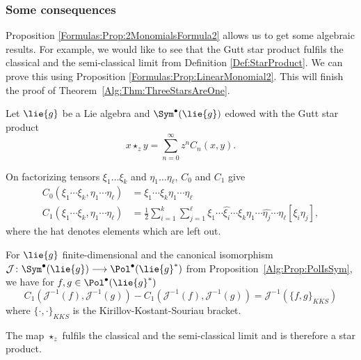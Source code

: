 \subsubsection*{Some consequences}
Proposition \ref{Formulas:Prop:2MonomialsFormula2} allows us to get some 
algebraic results. For example, we would like to see that the Gutt star 
product fulfils the classical and the semi-classical limit from Definition 
\ref{Def:StarProduct}. We can prove this using Proposition 
\ref{Formulas:Prop:LinearMonomial2}. This will finish the proof of 
Theorem~\ref{Alg:Thm:ThreeStarsAreOne}.
\begin{corollary}
	\label{Formulas:Cor:LimitCases}
	Let $\lie{g}$ be a Lie algebra and $\Sym^{\bullet}(\lie{g})$ edowed with 
	the Gutt star product
	\begin{equation*}
		x \star_z y
		= 
		\sum\limits_{n = 0}^{\infty}
		z^n C_n(x,y).
	\end{equation*}	
	\begin{corollarylist}
		\item
		On factorizing tensors $\xi_1 \ldots \xi_k$ and $\eta_1 \ldots 
		\eta_{\ell}$, $C_0$ and $C_1$ give
		\begin{align}
			\label{Formulas:ClassicalLimit}
			C_0 \left(
				\xi_1 \cdots \xi_k, \eta_1 \cdots \eta_{\ell}
			\right)
			& = 
			\xi_1 \cdots \xi_k \eta_1 \cdots \eta_{\ell}
			\\
			\label{Formulas:SemiClassicalLimit}
			C_1 \left(
				\xi_1 \cdots \xi_k, \eta_1 \cdots \eta_{\ell}
			\right)
				& =
			\frac{1}{2}	
			\sum\limits_{i = 1}^k
			\sum\limits_{j = 1}^{\ell}
			\xi_1 \cdots \widehat{\xi_i} \cdots \xi_k
			\eta_1 \cdots \widehat{\eta_j} \cdots \eta_{\ell}
			[\xi_i \eta_j],
		\end{align}
		where the hat denotes elements which are left out.
		
		\item
		For $\lie{g}$ finite-dimensional and the canonical isomorphism 
		$\mathcal{J} \colon \Sym^{\bullet}(\lie{g}) \longrightarrow 
		\Pol^{\bullet}(\lie{g}^*)$ from Proposition~\ref{Alg:Prop:PolIsSym},
		we have for $f,g \in \Pol^{\bullet}(\lie{g}^*)$
		\begin{equation*}
			C_1 \left(
				\mathcal{J}^{-1} (f),
				\mathcal{J}^{-1} (g)
			\right)
			-
			C_1 \left(
				\mathcal{J}^{-1} (f),
				\mathcal{J}^{-1} (g)
			\right)
			= 
			\mathcal{J}^{-1} \left( 
				\{ f, g \}_{KKS}
			\right)
		\end{equation*}
		where $\{ \cdot, \cdot \}_{KKS}$ is the Kirillov-Kostant-Souriau 
		bracket.
		
		\item
		The map $\star_z$ fulfils the classical and the semi-classical limit 
		and is therefore a star product.
	\end{corollarylist}
\end{corollary}
